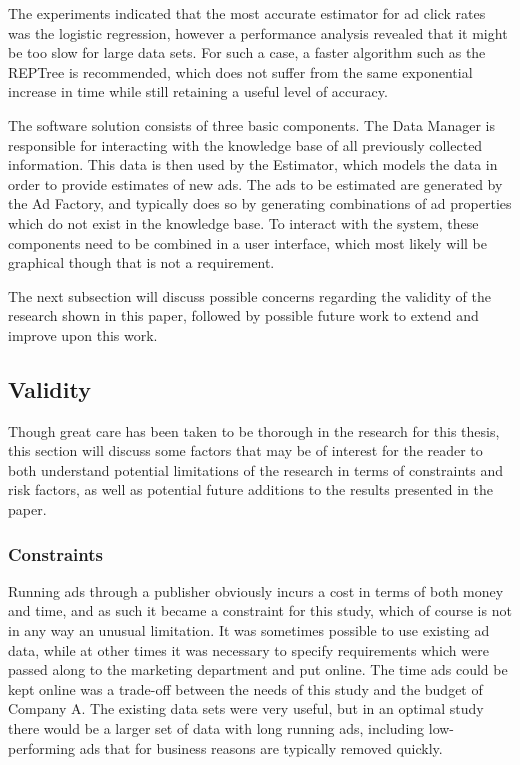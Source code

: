 \documentclass{sig-alternate}
\begin{document}
The experiments indicated that the most accurate estimator for ad click rates was the logistic regression, however a performance analysis revealed that it might be too slow for large data sets. For such a case, a faster algorithm such as the REPTree is recommended, which does not suffer from the same exponential increase in time while still retaining a useful level of accuracy.

The software solution consists of three basic components. The Data Manager is responsible for interacting with the knowledge base of all previously collected information. This data is then used by the Estimator, which models the data in order to provide estimates of new ads. The ads to be estimated are generated by the Ad Factory, and typically does so by generating combinations of ad properties which do not exist in the knowledge base. To interact with the system, these components need to be combined in a user interface, which most likely will be graphical though that is not a requirement.

The next subsection will discuss possible concerns regarding the validity of the research shown in this paper, followed by possible future work to extend and improve upon this work.

\subsection{Validity}
Though great care has been taken to be thorough in the research for this thesis, this section will discuss some factors that may be of interest for the reader to both understand potential limitations of the research in terms of constraints and risk factors, as well as potential future additions to the results presented in the paper.

\subsubsection{Constraints}
Running ads through a publisher obviously incurs a cost in terms of both money and time, and as such it became a constraint for this study, which of course is not in any way an unusual limitation. It was sometimes possible to use existing ad data, while at other times it was necessary to specify requirements which were passed along to the marketing department and put online. The time ads could be kept online was a trade-off between the needs of this study and the budget of Company A. The existing data sets were very useful, but in an optimal study there would be a larger set of data with long running ads, including low-performing ads that for business reasons are typically removed quickly.
\end{document}
